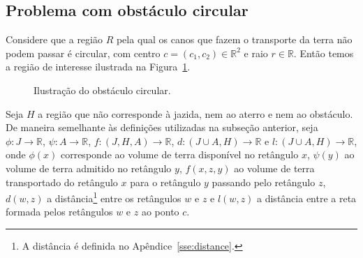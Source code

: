 \subsection{Problema com obstáculo circular}
Considere que a região $R$ pela qual os canos que fazem o transporte da terra
não podem passar é circular, com centro $c = (c_1, c_2) \in \mathbb{R}^2$ e raio
$r \in \mathbb{R}$. Então temos a região de interesse ilustrada na
Figura~\ref{fig:disc_J_A_R}.
\begin{figure}[!htb]
    \centering
    \caption{Ilustra\c{c}\~{a}o do obstáculo circular.}
    \label{fig:disc_J_A_R}
\end{figure}

Seja $H$ a região que não corresponde \`{a} jazida, nem ao aterro e nem ao
obstáculo. De maneira semelhante \`{a}s definições utilizadas na subseção
anterior, seja $\phi: J \to \mathbb{R}$, $\psi: A \to \mathbb{R}$,
$f: (J, H, A) \to \mathbb{R}$, $d: (J \cup A, H) \to \mathbb{R}$ e $l:
(J \cup A, H) \to \mathbb{R}$, onde $\phi(x)$ corresponde ao volume de terra
disponível no retângulo $x$, $\psi(y)$ ao volume de terra admitido no retângulo
$y$, $f(x, z, y)$ ao volume de terra transportado do retângulo $x$ para o
retângulo $y$ passando pelo retângulo $z$, $d(w, z)$ a distância\footnote{A
distância é definida no Apêndice~\ref{sse:distance}.} entre os
retângulos $w$ e $z$ e $l(w, z)$ a distância entre a reta
formada pelos retângulos $w$ e $z$ ao ponto $c$.

